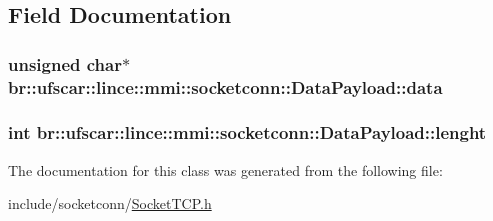 \subsection{Field Documentation}
\hypertarget{classbr_1_1ufscar_1_1lince_1_1mmi_1_1socketconn_1_1DataPayload_a3395f32c56fd47914fdf6771b507b43f}{
\subsubsection[{data}]{\setlength{\rightskip}{0pt plus 5cm}unsigned char$\ast$ {\bf br::ufscar::lince::mmi::socketconn::DataPayload::data}}}
\label{classbr_1_1ufscar_1_1lince_1_1mmi_1_1socketconn_1_1DataPayload_a3395f32c56fd47914fdf6771b507b43f}
\hypertarget{classbr_1_1ufscar_1_1lince_1_1mmi_1_1socketconn_1_1DataPayload_a8ad1decf0c882fe9b7037966f60bee2c}{
\subsubsection[{lenght}]{\setlength{\rightskip}{0pt plus 5cm}int {\bf br::ufscar::lince::mmi::socketconn::DataPayload::lenght}}}
\label{classbr_1_1ufscar_1_1lince_1_1mmi_1_1socketconn_1_1DataPayload_a8ad1decf0c882fe9b7037966f60bee2c}


The documentation for this class was generated from the following file:\begin{DoxyCompactItemize}
\item 
include/socketconn/\hyperlink{SocketTCP_8h}{SocketTCP.h}\end{DoxyCompactItemize}
